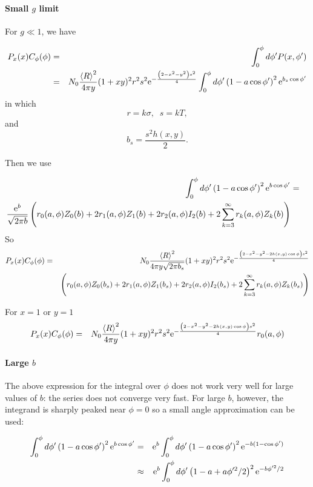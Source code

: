 \documentclass[11pt]{article}
\newcommand{\e}{{\rm e}}
\begin{document}
{{{{\paragraph{Small $g$ limit}
For $g\ll 1$, we have


\begin{eqnarray}
P_x(x)C_{\phi}(\phi)&=&\int_{0}^{\phi}d\phi' P(x,\phi')\\
&=& N_{0}\frac{\left<R\right>^{2}}{4\pi y}(1+xy)^{2}r^{2}s^{2}\e^{-\frac{\left(2-x^{2}-y^{2}\right)s^{2}}{4}}
\int_{0}^{\phi}d\phi'\left(1-a\cos\phi'\right)^{2}\e^{b_{s}\cos\phi'}
\end{eqnarray}
in which
$$r=k\sigma,\;\;s=kT,$$
and
$$b_{s}=\frac{s^{2}h(x,y)}{2}.$$

Then we use

\begin{eqnarray}
\int_{0}^{\phi}d\phi'\left(1-a\cos\phi' \right)^{2}\e^{b\cos\phi'}&=&\\
\frac{\e^{b}}{\sqrt{2\pi b}}\left(
r_{0}(a,\phi)Z_{0}(b)+2r_{1}(a,\phi)Z_{1}(b)+2r_{2}(a,\phi)I_{2}(b)+2\sum_{k=3}^{\infty}r_{k}(a,\phi)Z_{k}(b)\right)
\end{eqnarray}
So
\begin{eqnarray}
P_x(x)C_{\phi}(\phi)&=& N_{0}\frac{\left<R\right>^{2}}{4\pi y\sqrt{2\pi b_{s}}}(1+xy)^{2}r^{2}s^{2}\e^{-\frac{\left(2-x^{2}-y^{2}-2h(x,y)\cos\phi\right)s^{2}}{4}}\\
&&\left(
r_{0}(a,\phi)Z_{0}(b_{s})+2r_{1}(a,\phi)Z_{1}(b_{s})+2r_{2}(a,\phi)I_{2}(b_{s})+2\sum_{k=3}^{\infty}r_{k}(a,\phi)Z_{k}(b_{s})\right)
\end{eqnarray}

For $x=1$ or $y=1$
\begin{eqnarray}
P_x(x)C_{\phi}(\phi)&=& N_{0}\frac{\left<R\right>^{2}}{4\pi y}(1+xy)^{2}r^{2}s^{2}\e^{-\frac{\left(2-x^{2}-y^{2}-2h(x,y)\cos\phi\right)s^{2}}{4}}
r_{0}(a,\phi)\end{eqnarray}




\paragraph{Large $b$}
The above expression for the integral over $\phi$ does not work very well for large values of $b$: the series does not converge very fast. For large $b$, however, the integrand  is sharply peaked near $\phi=0$ so a small angle approximation can be used:

\begin{eqnarray}
\int_{0}^{\phi}d\phi'\left(1-a\cos\phi' \right)^{2}\e^{b\cos\phi'}&=&\e^{b}\int_{0}^{\phi}d\phi'\left(1-a\cos\phi' \right)^{2}\e^{-b(1-\cos\phi')}\\
&\approx&\e^{b}\int_{0}^{\phi}d\phi'\left(1-a+a\phi'^{2}/2\right)^{2}\e^{-b\phi'^{2}/2}\end{eqnarray}

}}}}
\end{document}
